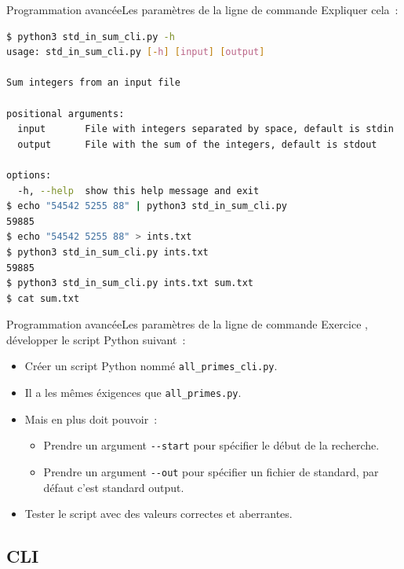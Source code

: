 \documentclass{beamer}
\begin{document}
    \begin{frame}[fragile]{Programmation avancée}{Les paramètres de la ligne de commande}
        Expliquer cela~:
        \begin{lstlisting}[language=Bash]
$ python3 std_in_sum_cli.py -h
usage: std_in_sum_cli.py [-h] [input] [output]

Sum integers from an input file

positional arguments:
  input       File with integers separated by space, default is stdin
  output      File with the sum of the integers, default is stdout

options:
  -h, --help  show this help message and exit
$ echo "54542 5255 88" | python3 std_in_sum_cli.py
59885
$ echo "54542 5255 88" > ints.txt
$ python3 std_in_sum_cli.py ints.txt
59885
$ python3 std_in_sum_cli.py ints.txt sum.txt
$ cat sum.txt
        \end{lstlisting}
    \end{frame}

    \begin{frame}{Programmation avancée}{Les paramètres de la ligne de commande}
        Exercice \execcounterdispinc{}, développer le script Python suivant~:
        \begin{itemize}
            \item Créer un script Python nommé \lstinline{all_primes_cli.py}.
            \item Il a les mêmes éxigences que \lstinline{all_primes.py}.
            \item Mais en plus doit pouvoir~:
            \begin{itemize}
                \item Prendre un argument \lstinline{--start} pour spécifier le début de la recherche.
                \item Prendre un argument \lstinline{--out} pour spécifier un fichier de standard, par défaut c'est standard output.
            \end{itemize}
            \item Tester le script avec des valeurs correctes et aberrantes.
        \end{itemize}
    \end{frame}

    \subsection{CLI}\label{subsec:cli}
\end{document}
